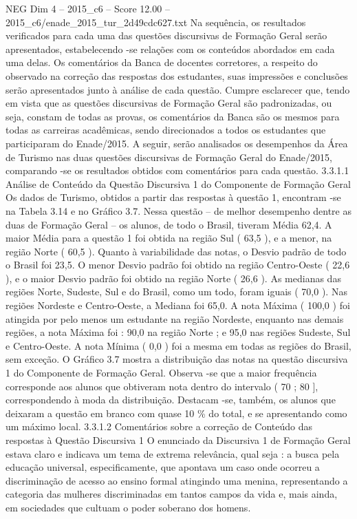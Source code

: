 \begin{textsample}{NEG Dim 4 – 2015\_c6 – Score 12.00 – 2015\_c6/enade\_2015\_tur\_2d49cdc627.txt}
Na sequência, os resultados verificados para cada uma das questões discursivas de Formação Geral serão apresentados, estabelecendo -se relações com os conteúdos abordados em cada uma delas.
Os comentários da Banca de docentes corretores, a respeito do observado na correção das respostas dos estudantes, suas impressões e conclusões serão apresentados junto à análise de cada questão.
Cumpre esclarecer que, tendo em vista que as questões discursivas de Formação Geral são padronizadas, ou seja, constam de todas as provas, os comentários da Banca são os mesmos para todas as carreiras acadêmicas, sendo direcionados a todos os estudantes que participaram do Enade/2015.
A seguir, serão analisados os desempenhos da Área de Turismo nas duas questões discursivas de Formação Geral do Enade/2015, comparando -se os resultados obtidos com comentários para cada questão. 3.3.1.1 Análise de Conteúdo da Questão Discursiva 1 do Componente de Formação Geral Os dados de Turismo, obtidos a partir das respostas à questão 1, encontram -se na Tabela 3.14 e no Gráfico 3.7.
Nessa questão – de melhor desempenho dentre as duas de Formação Geral – os alunos, de todo o Brasil, tiveram Média 62,4.
A maior Média para a questão 1 foi obtida na região Sul ( 63,5 ), e a menor, na região Norte ( 60,5 ).
Quanto à variabilidade das notas, o Desvio padrão de todo o Brasil foi 23,5.
O menor Desvio padrão foi obtido na região Centro-Oeste ( 22,6 ), e o maior Desvio padrão foi obtido na região Norte ( 26,6 ).
As medianas das regiões Norte, Sudeste, Sul e do Brasil, como um todo, foram iguais ( 70,0 ).
Nas regiões Nordeste e Centro-Oeste, a Mediana foi 65,0.
A nota Máxima ( 100,0 ) foi atingida por pelo menos um estudante na região Nordeste, enquanto nas demais regiões, a nota Máxima foi : 90,0 na região Norte ; e 95,0 nas regiões Sudeste, Sul e Centro-Oeste.
A nota Mínima ( 0,0 ) foi a mesma em todas as regiões do Brasil, sem exceção.
O Gráfico 3.7 mostra a distribuição das notas na questão discursiva 1 do Componente de Formação Geral.
Observa -se que a maior frequência corresponde aos alunos que obtiveram nota dentro do intervalo ( 70 ; 80 ], correspondendo à moda da distribuição.
Destacam -se, também, os alunos que deixaram a questão em branco com quase 10 \% do total, e se apresentando como um máximo local. 3.3.1.2 Comentários sobre a correção de Conteúdo das respostas à Questão Discursiva 1 O enunciado da Discursiva 1 de Formação Geral estava claro e indicava um tema de extrema relevância, qual seja : a busca pela educação universal, especificamente, que apontava um caso onde ocorreu a discriminação de acesso ao ensino formal atingindo uma menina, representando a categoria das mulheres discriminadas em tantos campos da vida e, mais ainda, em sociedades que cultuam o poder soberano dos homens.

\end{textsample}
